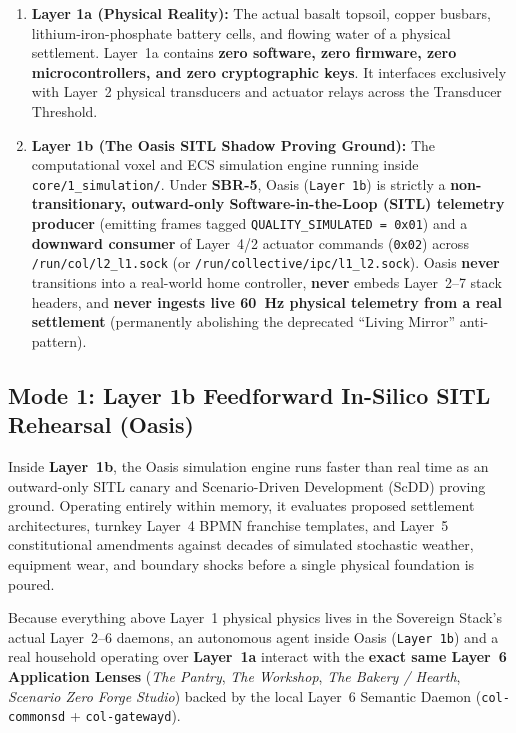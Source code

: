 \begin{enumerate}
    \item \textbf{Layer 1a (Physical Reality):} The actual basalt topsoil, copper busbars, lithium-iron-phosphate battery cells, and flowing water of a physical settlement. Layer~1a contains \textbf{zero software, zero firmware, zero microcontrollers, and zero cryptographic keys}. It interfaces exclusively with Layer~2 physical transducers and actuator relays across the Transducer Threshold.
    \item \textbf{Layer 1b (The Oasis SITL Shadow Proving Ground):} The computational voxel and ECS simulation engine running inside \texttt{core/1\_simulation/}. Under \textbf{SBR-5}, Oasis (\texttt{Layer 1b}) is strictly a \textbf{non-transitionary, outward-only Software-in-the-Loop (SITL) telemetry producer} (emitting frames tagged \texttt{QUALITY\_SIMULATED = 0x01}) and a \textbf{downward consumer} of Layer~4/2 actuator commands (\texttt{0x02}) across \texttt{/run/col/l2\_l1.sock} (or \texttt{/run/collective/ipc/l1\_l2.sock}). Oasis \textbf{never} transitions into a real-world home controller, \textbf{never} embeds Layer~2--7 stack headers, and \textbf{never ingests live 60~Hz physical telemetry from a real settlement} (permanently abolishing the deprecated ``Living Mirror'' anti-pattern).
\end{enumerate}

\subsection{Mode 1: Layer 1b Feedforward In-Silico SITL Rehearsal (Oasis)}

Inside \textbf{Layer~1b}, the Oasis simulation engine runs faster than real time as an outward-only SITL canary and Scenario-Driven Development (ScDD) proving ground. Operating entirely within memory, it evaluates proposed settlement architectures, turnkey Layer~4 BPMN franchise templates, and Layer~5 constitutional amendments against decades of simulated stochastic weather, equipment wear, and boundary shocks before a single physical foundation is poured.

Because everything above Layer~1 physical physics lives in the Sovereign Stack's actual Layer~2--6 daemons, an autonomous agent inside Oasis (\texttt{Layer 1b}) and a real household operating over \textbf{Layer~1a} interact with the \textbf{exact same Layer~6 Application Lenses} (\textit{The Pantry}, \textit{The Workshop}, \textit{The Bakery / Hearth}, \textit{Scenario Zero Forge Studio}) backed by the local Layer~6 Semantic Daemon (\texttt{col-commonsd} + \texttt{col-gatewayd}).

